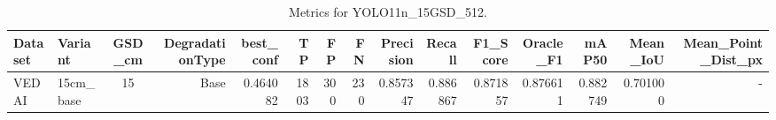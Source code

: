 \begin{table}
\caption{Metrics for YOLO11n_15GSD_512.}
\label{tab:rq1_results}
\begin{tabular}{llcrrrrrrrrrrrr}
\toprule
Dataset & Variant & GSD_cm & DegradationType & best_conf & TP & FP & FN & Precision & Recall & F1_Score & Oracle_F1 & mAP50 & Mean_IoU & Mean_Point_Dist_px \\
\midrule
VEDAI & 15cm_base & 15 & Base & 0.464082 & 1803 & 300 & 230 & 0.857347 & 0.886867 & 0.871857 & 0.876611 & 0.882749 & 0.701000 & - \\
\bottomrule
\end{tabular}
\end{table}
